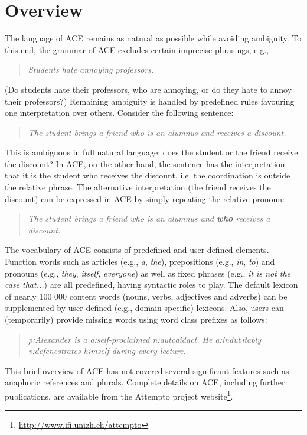 \documentclass[12pt]{report}
\begin{document}
\section{Overview}

The language of ACE remains as natural as possible while avoiding ambiguity. To this end, the grammar of ACE excludes certain imprecise phrasings, e.g.,
\begin{quote}
\textit{Students hate annoying professors.}
\end{quote}
(Do students hate their professors, who are annoying, or do they hate to annoy their professors?) Remaining ambiguity is handled by predefined rules favouring one interpretation over others. Consider the following sentence:
\begin{quote}
\textit{The student brings a friend who is an alumnus and receives a discount.}
\end{quote}
This is ambiguous in full natural language: does the student or the friend receive the discount? In ACE, on the other hand, the sentence has the interpretation that it is the student who receives the discount, i.e. the coordination is outside the relative phrase. The alternative interpretation (the friend receives the discount) can be expressed in ACE by simply repeating the relative pronoun:
\begin{quote}
\textit{The student brings a friend who is an alumnus and \textbf{who} receives a discount.}
\end{quote}
The vocabulary of ACE consists of predefined and user-defined elements. Function words such as articles (e.g., \textit{a}, \textit{the}), prepositions (e.g., \textit{in}, \textit{to}) and pronouns (e.g., \textit{they}, \textit{itself}, \textit{everyone}) as well as fixed phrases (e.g., \textit{it is not the case that...}) are all predefined, having syntactic roles to play. The default lexicon of nearly 100 000 content words (nouns, verbs, adjectives and adverbs) can be supplemented by user-defined (e.g., domain-specific) lexicons. Also, users can (temporarily) provide missing words using word class prefixes as follows:
\begin{quote}
\textit{p:Alexander is a a:self-proclaimed n:autodidact. He a:indubitably v:defenestrates himself during every lecture.}
\end{quote}
This brief overview of ACE has not covered several significant features such as anaphoric references and plurals. Complete details on ACE, including further publications, are available from the Attempto project website\footnote{\url{http://www.ifi.unizh.ch/attempto}}.
\end{document}

